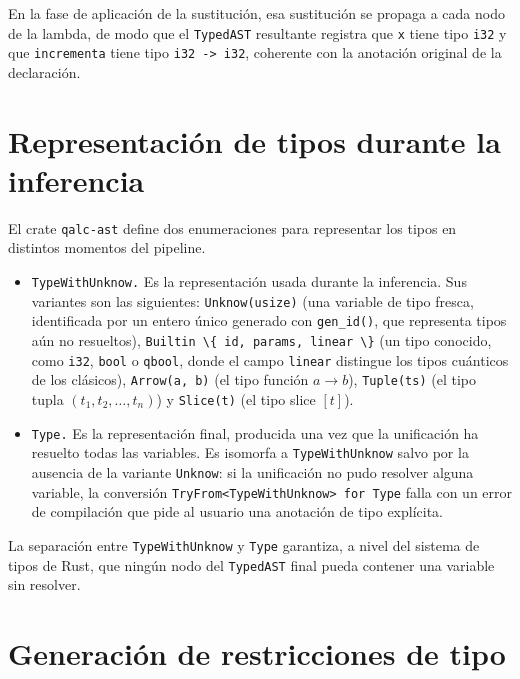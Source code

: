 En la fase de aplicación de la sustitución, esa sustitución se propaga a cada nodo de la lambda, de modo que el \lstinline|TypedAST| resultante registra que \lstinline|x| tiene tipo \lstinline|i32| y que \lstinline|incrementa| tiene tipo \lstinline|i32 -> i32|, coherente con la anotación original de la declaración.

\section{Representación de tipos durante la inferencia}

El crate \lstinline|qalc-ast| define dos enumeraciones para representar los tipos en distintos momentos del pipeline.

\begin{itemize}
  \item \texttt{TypeWithUnknow.} Es la representación usada durante la inferencia. Sus variantes son las siguientes: \lstinline|Unknow(usize)| (una variable de tipo fresca, identificada por un entero único generado con \lstinline|gen_id()|, que representa tipos aún no resueltos), \lstinline|Builtin \{ id, params, linear \}| (un tipo conocido, como \lstinline|i32|, \lstinline|bool| o \lstinline|qbool|, donde el campo \lstinline|linear| distingue los tipos cuánticos de los clásicos), \lstinline|Arrow(a, b)| (el tipo función $a \to b$), \lstinline|Tuple(ts)| (el tipo tupla $(t_1, t_2, \ldots, t_n)$) y \lstinline|Slice(t)| (el tipo slice $[t]$).

  \item \texttt{Type.} Es la representación final, producida una vez que la unificación ha resuelto todas las variables. Es isomorfa a \lstinline|TypeWithUnknow| salvo por la ausencia de la variante \lstinline|Unknow|: si la unificación no pudo resolver alguna variable, la conversión \lstinline|TryFrom<TypeWithUnknow> for Type| falla con un error de compilación que pide al usuario una anotación de tipo explícita.
\end{itemize}

La separación entre \lstinline|TypeWithUnknow| y \lstinline|Type| garantiza, a nivel del sistema de tipos de Rust, que ningún nodo del \lstinline|TypedAST| final pueda contener una variable sin resolver.

\section{Generación de restricciones de tipo}
\label{sec:constraint-gen}

